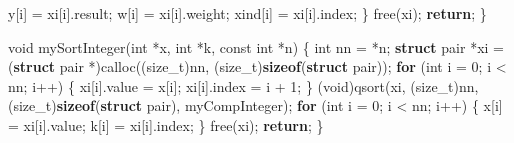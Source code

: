 \documentclass[
  12pt,
  letterpaper,
  DIV=11,
  numbers=noendperiod]{scrreprt}
\newenvironment{Shaded}{\begin{snugshade}}{\end{snugshade}}
\newcommand{\ControlFlowTok}[1]{\textcolor[rgb]{0.00,0.23,0.31}{\textbf{#1}}}
\newcommand{\DataTypeTok}[1]{\textcolor[rgb]{0.68,0.00,0.00}{#1}}
\newcommand{\DecValTok}[1]{\textcolor[rgb]{0.68,0.00,0.00}{#1}}
\newcommand{\KeywordTok}[1]{\textcolor[rgb]{0.00,0.23,0.31}{\textbf{#1}}}
\newcommand{\NormalTok}[1]{\textcolor[rgb]{0.00,0.23,0.31}{#1}}
\newcommand{\OperatorTok}[1]{\textcolor[rgb]{0.37,0.37,0.37}{#1}}
\theoremstyle{remark}
\begin{document}
\begin{Shaded}
\begin{Highlighting}[]
\NormalTok{        y}\OperatorTok{[}\NormalTok{i}\OperatorTok{]} \OperatorTok{=}\NormalTok{ xi}\OperatorTok{[}\NormalTok{i}\OperatorTok{].}\NormalTok{result}\OperatorTok{;}
\NormalTok{        w}\OperatorTok{[}\NormalTok{i}\OperatorTok{]} \OperatorTok{=}\NormalTok{ xi}\OperatorTok{[}\NormalTok{i}\OperatorTok{].}\NormalTok{weight}\OperatorTok{;}
\NormalTok{        xind}\OperatorTok{[}\NormalTok{i}\OperatorTok{]} \OperatorTok{=}\NormalTok{ xi}\OperatorTok{[}\NormalTok{i}\OperatorTok{].}\NormalTok{index}\OperatorTok{;}
    \OperatorTok{\}}
\NormalTok{    free}\OperatorTok{(}\NormalTok{xi}\OperatorTok{);}
    \ControlFlowTok{return}\OperatorTok{;}
\OperatorTok{\}}

\DataTypeTok{void}\NormalTok{ mySortInteger}\OperatorTok{(}\DataTypeTok{int} \OperatorTok{*}\NormalTok{x}\OperatorTok{,} \DataTypeTok{int} \OperatorTok{*}\NormalTok{k}\OperatorTok{,} \DataTypeTok{const} \DataTypeTok{int} \OperatorTok{*}\NormalTok{n}\OperatorTok{)} \OperatorTok{\{}
    \DataTypeTok{int}\NormalTok{ nn }\OperatorTok{=} \OperatorTok{*}\NormalTok{n}\OperatorTok{;}
    \KeywordTok{struct}\NormalTok{ pair }\OperatorTok{*}\NormalTok{xi }\OperatorTok{=}
        \OperatorTok{(}\KeywordTok{struct}\NormalTok{ pair }\OperatorTok{*)}\NormalTok{calloc}\OperatorTok{((}\DataTypeTok{size\_t}\OperatorTok{)}\NormalTok{nn}\OperatorTok{,} \OperatorTok{(}\DataTypeTok{size\_t}\OperatorTok{)}\KeywordTok{sizeof}\OperatorTok{(}\KeywordTok{struct}\NormalTok{ pair}\OperatorTok{));}
    \ControlFlowTok{for} \OperatorTok{(}\DataTypeTok{int}\NormalTok{ i }\OperatorTok{=} \DecValTok{0}\OperatorTok{;}\NormalTok{ i }\OperatorTok{\textless{}}\NormalTok{ nn}\OperatorTok{;}\NormalTok{ i}\OperatorTok{++)} \OperatorTok{\{}
\NormalTok{        xi}\OperatorTok{[}\NormalTok{i}\OperatorTok{].}\NormalTok{value }\OperatorTok{=}\NormalTok{ x}\OperatorTok{[}\NormalTok{i}\OperatorTok{];}
\NormalTok{        xi}\OperatorTok{[}\NormalTok{i}\OperatorTok{].}\NormalTok{index }\OperatorTok{=}\NormalTok{ i }\OperatorTok{+} \DecValTok{1}\OperatorTok{;}
    \OperatorTok{\}}
    \OperatorTok{(}\DataTypeTok{void}\OperatorTok{)}\NormalTok{qsort}\OperatorTok{(}\NormalTok{xi}\OperatorTok{,} \OperatorTok{(}\DataTypeTok{size\_t}\OperatorTok{)}\NormalTok{nn}\OperatorTok{,} \OperatorTok{(}\DataTypeTok{size\_t}\OperatorTok{)}\KeywordTok{sizeof}\OperatorTok{(}\KeywordTok{struct}\NormalTok{ pair}\OperatorTok{),}\NormalTok{ myCompInteger}\OperatorTok{);}
    \ControlFlowTok{for} \OperatorTok{(}\DataTypeTok{int}\NormalTok{ i }\OperatorTok{=} \DecValTok{0}\OperatorTok{;}\NormalTok{ i }\OperatorTok{\textless{}}\NormalTok{ nn}\OperatorTok{;}\NormalTok{ i}\OperatorTok{++)} \OperatorTok{\{}
\NormalTok{        x}\OperatorTok{[}\NormalTok{i}\OperatorTok{]} \OperatorTok{=}\NormalTok{ xi}\OperatorTok{[}\NormalTok{i}\OperatorTok{].}\NormalTok{value}\OperatorTok{;}
\NormalTok{        k}\OperatorTok{[}\NormalTok{i}\OperatorTok{]} \OperatorTok{=}\NormalTok{ xi}\OperatorTok{[}\NormalTok{i}\OperatorTok{].}\NormalTok{index}\OperatorTok{;}
    \OperatorTok{\}}
\NormalTok{    free}\OperatorTok{(}\NormalTok{xi}\OperatorTok{);}
    \ControlFlowTok{return}\OperatorTok{;}
\OperatorTok{\}}


\end{Highlighting}
\end{Shaded}
\end{document}

